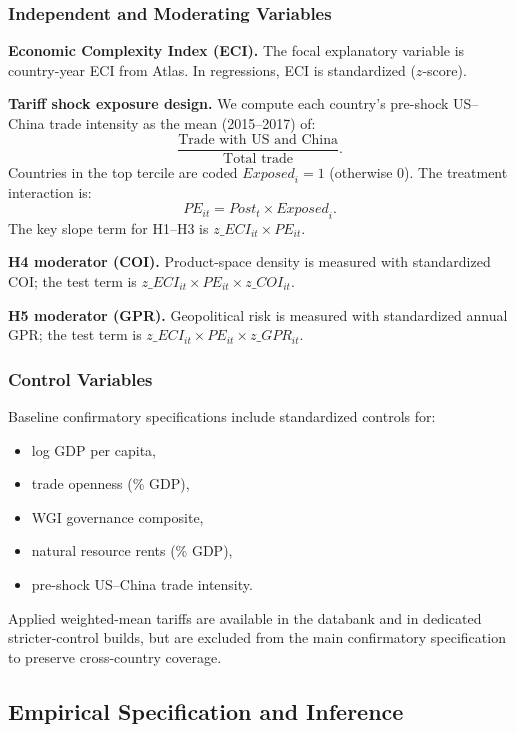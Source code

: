 \subsubsection{Independent and Moderating Variables}

\textbf{Economic Complexity Index (ECI).} The focal explanatory variable is country-year ECI from Atlas. In regressions, ECI is standardized ($z$-score).

\textbf{Tariff shock exposure design.} We compute each country's pre-shock US--China trade intensity as the mean (2015--2017) of:
\[
\frac{\text{Trade with US and China}}{\text{Total trade}}.
\]
Countries in the top tercile are coded $\textit{Exposed}_i=1$ (otherwise 0). The treatment interaction is:
\[
\textit{PE}_{it}=\textit{Post}_{t}\times \textit{Exposed}_{i}.
\]
The key slope term for H1--H3 is $z\_ECI_{it}\times \textit{PE}_{it}$.

\textbf{H4 moderator (COI).} Product-space density is measured with standardized COI; the test term is $z\_ECI_{it}\times \textit{PE}_{it}\times z\_COI_{it}$.

\textbf{H5 moderator (GPR).} Geopolitical risk is measured with standardized annual GPR; the test term is $z\_ECI_{it}\times \textit{PE}_{it}\times z\_GPR_{it}$.

\subsubsection{Control Variables}

Baseline confirmatory specifications include standardized controls for:
\begin{itemize}
\item log GDP per capita,
\item trade openness (\% GDP),
\item WGI governance composite,
\item natural resource rents (\% GDP),
\item pre-shock US--China trade intensity.
\end{itemize}

Applied weighted-mean tariffs are available in the databank and in dedicated stricter-control builds, but are excluded from the main confirmatory specification to preserve cross-country coverage.

\subsection{Empirical Specification and Inference}

